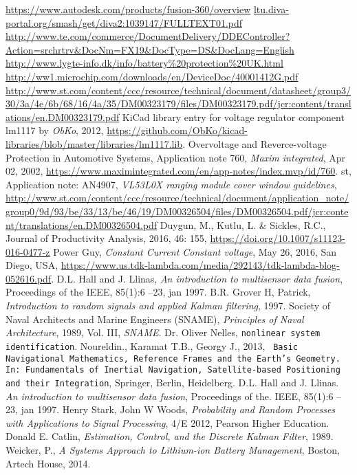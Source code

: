 \begin{thebibliography}{99}
\label{sec:ref}

	\url{https://www.autodesk.com/products/fusion-360/overview}
	\url{ltu.diva-portal.org/smash/get/diva2:1039147/FULLTEXT01.pdf}
	\url{http://www.te.com/commerce/DocumentDelivery/DDEController?Action=srchrtrv&DocNm=FX19&DocType=DS&DocLang=English}
	\url{http://www.lygte-info.dk/info/battery\%20protection\%20UK.html}
	\url{http://ww1.microchip.com/downloads/en/DeviceDoc/40001412G.pdf}
	\url{http://www.st.com/content/ccc/resource/technical/document/datasheet/group3/30/3a/4e/6b/68/16/4a/35/DM00323179/files/DM00323179.pdf/jcr:content/translations/en.DM00323179.pdf}
	KiCad library entry for voltage regulator component lm1117 by \emph{ObKo}, 2012,
	\url{https://github.com/ObKo/kicad-libraries/blob/master/libraries/lm1117.lib}.
	Overvoltage and Reverce-voltage Protection in Automotive Systems,
	Application note 760, \emph{Maxim integrated}, Apr 02, 2002, 
	\url{https://www.maximintegrated.com/en/app-notes/index.mvp/id/760}.
	\gls{st}, Application note: AN4907, \emph{VL53L0X ranging module cover window guidelines},
	\url{http://www.st.com/content/ccc/resource/technical/document/application_note/group0/9d/93/be/33/13/be/46/19/DM00326504/files/DM00326504.pdf/jcr:content/translations/en.DM00326504.pdf}
	Duygun, M., Kutlu, L. \& Sickles, R.C., Journal of Productivity Analysis, 2016, 46: 155, \url{https://doi.org/10.1007/s11123-016-0477-z}
	Power Guy, \emph{Constant Current Constant voltage}, May 26, 2016, San Diego, USA,
	\url{https://www.us.tdk-lambda.com/media/292143/tdk-lambda-blog-052616.pdf}.
	D.L. Hall and J. Llinas, \emph{An introduction to multisensor data fusion}, 
	Proceedings of the IEEE, 85(1):6 –23, jan 1997.
	B.R. Grover H, Patrick, \emph{Introduction to random signals and applied Kalman filtering}, 1997. 
	Society of Naval Architects and Marine Engineers (SNAME), \emph{Principles of Naval Architecture}, 1989, Vol. III, \emph{SNAME}. 
	Dr. Oliver Nelles, \texttt{nonlinear system identification}.
	Noureldin., Karamat T.B., Georgy J., 2013, \texttt{ Basic Navigational Mathematics, Reference Frames and the Earth’s Geometry. In: Fundamentals of Inertial Navigation, Satellite-based 	Positioning and their Integration}, Springer, Berlin, Heidelberg.
	D.L. Hall and J. Llinas. \emph{An introduction to multisensor data fusion}, Proceedings of the. IEEE, 85(1):6 –23, jan 1997.
	Henry Stark, John W Woods, \emph{Probability and Random Processes with Applications to Signal Processing}, 4/E 2012,
	 Pearson Higher Education.
	Donald E. Catlin, \emph{Estimation, Control, and the Discrete Kalman Filter}, 1989.
	Weicker, P., \emph{A Systems Approach to Lithium-ion Battery Management}, Boston, Artech House, 2014.
\end{thebibliography}
